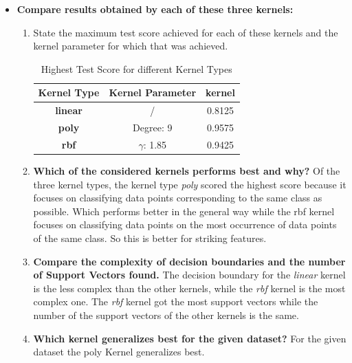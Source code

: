 \documentclass[a4paper]{article}
\begin{document}
\begin{enumerate}[label=(\alph*)]
\begin{itemize}
\item \textbf{Compare results obtained by each of these three kernels:}
\begin{enumerate}
\item State the maximum test score achieved for each of these kernels and the kernel parameter for which that was achieved.
\begin{table}[htp]
\centering
\label{max_test_score}
\begin{tabular}{|c|c|c|}
\hline
\textbf{Kernel Type} & \multicolumn{1}{l|}{\textbf{Kernel Parameter}} & \textbf{kernel} \\ \hline
\textbf{linear}      & /                                              & 0.8125          \\ \hline
\textbf{poly}  & Degree: 9                                      & 0.9575          \\ \hline
\textbf{rbf}         & $\gamma$: 1.85                    & 0.9425          \\ \hline
\end{tabular}
\caption{Highest Test Score for different Kernel Types}
\end{table}
\item \textbf{Which of the considered kernels performs best and why?} \newline
Of the three kernel types, the kernel type \textit{poly} scored the highest score because it focuses on classifying data points corresponding to the same class as possible. Which performs better in the general way while the rbf kernel focuses on classifying data points on the most occurrence of data points of the same class. So this is better for striking features. 
\item \textbf{Compare the complexity of decision boundaries and the number of Support Vectors found.} \newline
The decision boundary for the \textit{linear} kernel is the less complex than the other kernels, while the \textit{rbf} kernel is the most complex one. The \textit{rbf} kernel got the most support vectors while the number of the support vectors of the other kernels is the same.

\item \textbf{Which kernel generalizes best for the given dataset?} \newline
For the given dataset the poly Kernel generalizes best.
\end{enumerate}
\end{itemize}

\end{enumerate}
\end{document}
